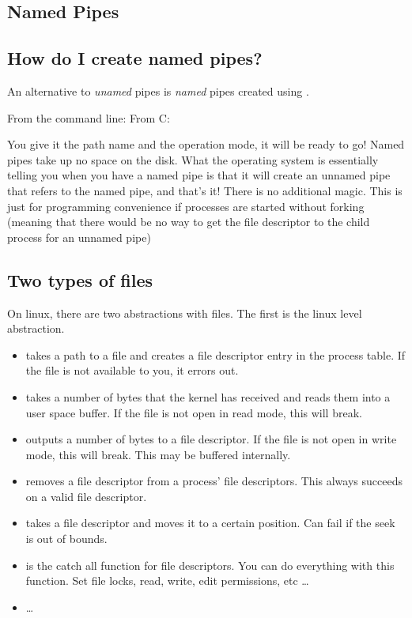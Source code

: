 \begin{enumerate}
\section{Named Pipes}\label{named-pipes}

\subsection{How do I create named pipes?}\label{how-do-i-create-named-pipes}

An alternative to \emph{unamed} pipes is \emph{named} pipes created using .

From the command line:  From C: 

You give it the path name and the operation mode, it will be ready to go! Named pipes take up no space on the disk. What the operating system is essentially telling you when you have a named pipe is that it will create an unnamed pipe that refers to the named pipe, and that's it! There is no additional magic. This is just for programming convenience if processes are started without forking (meaning that there would be no way to get the file descriptor to the child process for an unnamed pipe)


\subsection{Two types of files}

 On linux, there are two abstractions with files. The first is the linux  level abstraction.

 \begin{itemize}
\item {} takes a path to a file and creates a file descriptor entry in the process table. If the file is not available to you, it errors out.
\item {} takes a number of bytes that the kernel has received and reads them into a user space buffer. If the file is not open in read mode, this will break.
\item {} outputs a number of bytes to a file descriptor. If the file is not open in write mode, this will break. This may be buffered internally.
\item {} removes a file descriptor from a process' file descriptors. This always succeeds on a valid file descriptor.
\item {} takes a file descriptor and moves it to a certain position. Can fail if the seek is out of bounds.
\item {} is the catch all function for file descriptors. You can do everything with this function. Set file locks, read, write, edit permissions, etc \ldots{}
\item \ldots{}
 \end{itemize}


\end{enumerate}
